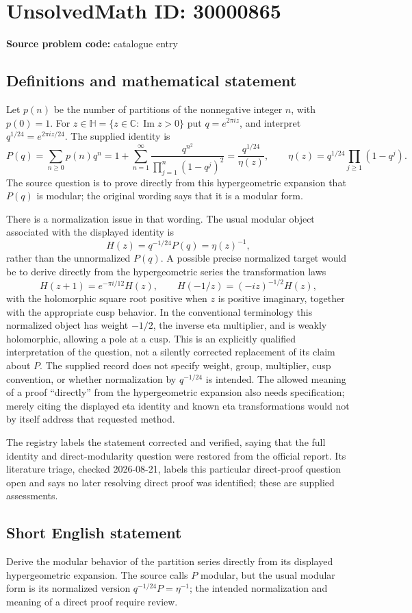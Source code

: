 \documentclass[11pt]{article}
\newcommand{\C}{\mathbb{C}}
\begin{document}
\section*{UnsolvedMath ID: 30000865}
\textbf{Source problem code:} catalogue entry
\subsection{Definitions and mathematical statement}
Let $p(n)$ be the number of partitions of the nonnegative integer $n$, with $p(0)=1$. For $z\in\mathbb H=\{z\in\C:\operatorname{Im}z>0\}$ put $q=e^{2\pi iz}$, and interpret $q^{1/24}=e^{2\pi iz/24}$. The supplied identity is
\[
P(q)=\sum_{n\geq0}p(n)q^n
=1+\sum_{n=1}^{\infty}\frac{q^{n^2}}{\prod_{j=1}^{n}(1-q^j)^2}
=\frac{q^{1/24}}{\eta(z)},
\qquad
\eta(z)=q^{1/24}\prod_{j\geq1}(1-q^j).
\]
The source question is to prove directly from this hypergeometric expansion that $P(q)$ is modular; the original wording says that it is a modular form.

There is a normalization issue in that wording. The usual modular object associated with the displayed identity is
\[
H(z)=q^{-1/24}P(q)=\eta(z)^{-1},
\]
rather than the unnormalized $P(q)$. A possible precise normalized target would be to derive directly from the hypergeometric series the transformation laws
\[
H(z+1)=e^{-\pi i/12}H(z),\qquad
H(-1/z)=(-iz)^{-1/2}H(z),
\]
with the holomorphic square root positive when $z$ is positive imaginary, together with the appropriate cusp behavior. In the conventional terminology this normalized object has weight $-1/2$, the inverse eta multiplier, and is weakly holomorphic, allowing a pole at a cusp. This is an explicitly qualified interpretation of the question, not a silently corrected replacement of its claim about $P$. The supplied record does not specify weight, group, multiplier, cusp convention, or whether normalization by $q^{-1/24}$ is intended. The allowed meaning of a proof ``directly'' from the hypergeometric expansion also needs specification; merely citing the displayed eta identity and known eta transformations would not by itself address that requested method.

The registry labels the statement corrected and verified, saying that the full identity and direct-modularity question were restored from the official report. Its literature triage, checked 2026-08-21, labels this particular direct-proof question open and says no later resolving direct proof was identified; these are supplied assessments.
\subsection{Short English statement}
Derive the modular behavior of the partition series directly from its displayed hypergeometric expansion. The source calls $P$ modular, but the usual modular form is its normalized version $q^{-1/24}P=\eta^{-1}$; the intended normalization and meaning of a direct proof require review.
\end{document}
